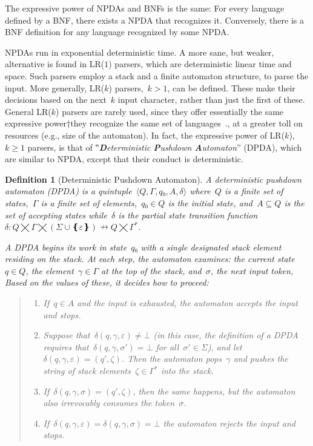 \documentclass[a4paper,USenglish]{lipics-v2016}
\newtheorem{Definition}{Definition}
\numberwithin{equation}{section}
\numberwithin{figure}{section}
\begin{document}
The expressive power of NPDAs and BNFs is the same:
  For every language defined by a BNF, there exists a NPDA that recognizes it.
Conversely, there is a BNF definition for any language recognized by some NPDA.

NPDAs run in exponential deterministic time.
 A more sane, but weaker, alternative is found in LR($1$) parsers,
  which are deterministic linear time and space.
Such parsers employ a stack and a finite automaton structure,
  to parse the input.
 More generally, LR($k$) parsers,~$k>1$, can be defined. These make their
 decisions based on the next~$k$ input character, rather than just the first of these.
 General LR($k$) parsers are rarely used, since they offer essentially
 the same expressive power†{they recognize the same set of languages~\cite{Knuth:65}.},
 at a greater toll on resources (e.g., size of the automaton).
In fact, the expressive power of LR($k$),~$k\ge1$ parsers, is that
 of ‟\emph{\textbf Deterministic \textbf Pushdown \textbf Automaton}” (DPDA),
  which are similar to NPDA, except that their conduct is deterministic.

\begin{Definition}[Deterministic Pushdown Automaton]
  \label{Definition:DPDA}
  \slshape
  A \textit{deterministic pushdown automaton} (DPDA) is a quintuple~$⟨Q,Γ,q₀,A,δ⟩$
  where~$Q$ is a finite set of \emph{states},~$Γ$ is a finite
  \emph{set of elements},~$q₀∈Q$ is the initial state,
  and~$A⊆Q$ is the \emph{set of accepting states} while~$δ$ is
  the \emph{partial state transition function}~$δ:Q⨉Γ⨉(Σ∪❴ε❵)↛Q⨉Γ^*$.
  \par
  A DPDA begins its work in state~$q₀$ with a single designated stack element residing on the stack.
  At each step, the automaton examines: the current state~$q∈Q$, 
  the element~$γ∈Γ$ at the top of the stack, and~$σ$, the next input token, 
  Based on the values of these, it decides how to proceed:
  \begin{quote}
  \begin{enumerate}
    \item If~$q∈A$ and the input is exhausted, the automaton accepts the input and stops.
    \item Suppose that~$δ(q,γ,ε)≠⊥$ (in this case, the definition of a DPDA
          requires that~$δ(q,γ,σ')=⊥$ for all~$σ'∈Σ$), and let~$δ(q,γ,ε)=(q',ζ)$.
          Then the automaton pops~$γ$ and pushes the string of stack
          elements~$ζ∈Γ^*$ into the stack.
    \item If~$δ(q,γ,σ)=(q',ζ)$, then the same happens, but the automaton also
          irrevocably consumes the token~$σ$.
    \item If~$δ(q,γ,ε)=δ(q,γ,σ)=⊥$ the automaton rejects the input and stops.
  \end{enumerate}
  \end{quote}
\end{Definition}
\end{document}
